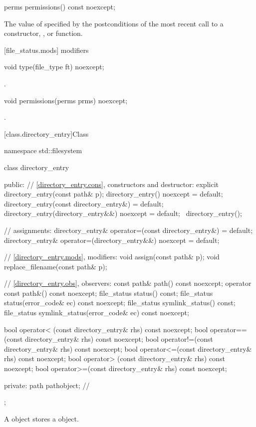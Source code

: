 \begin{itemdecl}
perms permissions() const noexcept;
\end{itemdecl}

\begin{itemdescr}
\pnum
\returns The value of  specified by the postconditions of the most recent call to a constructor,
  , or  function.
\end{itemdescr}

[file_status.mods]{ modifiers}

\begin{itemdecl}
void type(file_type ft) noexcept;
\end{itemdecl}

\begin{itemdescr}
\pnum
\postconditions {}.
\end{itemdescr}

\begin{itemdecl}
void permissions(perms prms) noexcept;
\end{itemdecl}

\begin{itemdescr}
\pnum
\postconditions {}.
\end{itemdescr}

[class.directory_entry]{Class }

\begin{codeblock}
namespace std::filesystem {
  class directory_entry {
  public:
    // \ref{directory_entry.cons}, constructors and destructor:
    explicit directory_entry(const path& p);
    directory_entry() noexcept = default;
    directory_entry(const directory_entry&) = default;
    directory_entry(directory_entry&&) noexcept = default;
   ~directory_entry();

    // assignments:
    directory_entry& operator=(const directory_entry&) = default;
    directory_entry& operator=(directory_entry&&) noexcept = default;

    // \ref{directory_entry.mods}, modifiers:
    void assign(const path& p);
    void replace_filename(const path& p);

    // \ref{directory_entry.obs}, observers:
    const path&  path() const noexcept;
    operator const path&() const noexcept;
    file_status  status() const;
    file_status  status(error_code& ec) const noexcept;
    file_status  symlink_status() const;
    file_status  symlink_status(error_code& ec) const noexcept;

    bool operator< (const directory_entry& rhs) const noexcept;
    bool operator==(const directory_entry& rhs) const noexcept;
    bool operator!=(const directory_entry& rhs) const noexcept;
    bool operator<=(const directory_entry& rhs) const noexcept;
    bool operator> (const directory_entry& rhs) const noexcept;
    bool operator>=(const directory_entry& rhs) const noexcept;

  private:
    path   pathobject; // \expos
  };
}
\end{codeblock}
\pnum
A  object stores a  object.

